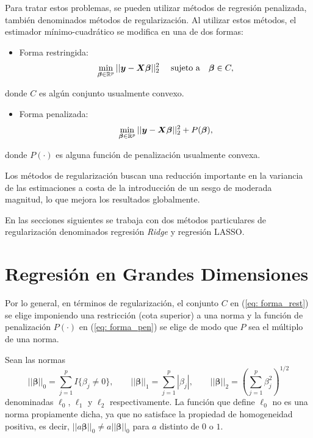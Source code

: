 \documentclass[a4paper,12pt]{report}
\begin{document}
Para tratar estos problemas, se pueden utilizar métodos de regresión penalizada, también denominados métodos de regularización. Al utilizar estos métodos, el estimador mínimo-cuadrático se modifica en una de dos formas:
\begin{itemize}
\item Forma restringida:
\begin{equation}
\label{eq: forma_rest}
\operatornamewithlimits{min}\limits_{\boldsymbol{\beta} \in \mathbb{R}^p} ||\boldsymbol{y}-\boldsymbol{X}\boldsymbol{\beta} ||_2^2 \text{ } \text{ } \text{ } \text{ sujeto a } \text{ } \text{ } \boldsymbol{\beta} \in C,
\end{equation}
\end{itemize}
donde $C$ es algún conjunto usualmente convexo.
\begin{itemize}
\item Forma penalizada:
\begin{equation}
\label{eq: forma_pen}
\operatornamewithlimits{min}\limits_{\boldsymbol{\beta} \in \mathbb{R}^p} ||\boldsymbol{y}-\boldsymbol{X}\boldsymbol{\beta} ||_2^2 + P(\boldsymbol{\beta}),
\end{equation}
\end{itemize}
donde $P(\cdot)$ es alguna función de penalización usualmente convexa.

Los métodos de regularización buscan una reducción importante en la variancia de las estimaciones a costa de la introducción de un sesgo de moderada magnitud, lo que mejora los resultados globalmente.

En las secciones siguientes se trabaja con dos métodos particulares de regularización denominados regresión \textit{Ridge} y regresión LASSO.

\section{Regresión en Grandes Dimensiones}
Por lo general, en términos de regularización, el conjunto $C$ en (\ref{eq: forma_rest}) se elige imponiendo una restricción (cota superior) a una norma y la función de penalización $P(\cdot)$ en (\ref{eq: forma_pen}) se elige de modo que $P$ sea el múltiplo de una norma.

Sean las normas $$||\boldsymbol{\beta}||_0=\sum_{j=1}^pI\{\beta_j\neq 0\}, \text{ } \text{ } \text{ } ||\boldsymbol{\beta}||_1=\sum_{j=1}^p|\beta_j|, \text{ } \text{ } \text{ } ||\boldsymbol{\beta}||_2=\left(\sum_{j=1}^p\beta_j^2\right)^{1/2}$$ denominadas $\ell_0$, $\ell_1$ y $\ell_2$ respectivamente. La función que define $\ell_0$ no es una norma propiamente dicha, ya que no satisface la propiedad de homogeneidad positiva, es decir, $||a\boldsymbol{\beta}||_0 \neq a||\boldsymbol{\beta}||_0$ para $a$ distinto de $0$ o $1$.
\end{document}
